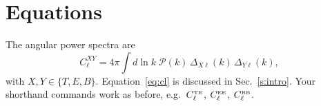\section{Equations}
    \label{s:eq}
    The angular power spectra are
    \begin{equation}
        C_\ell^{XY} = 4\pi \int d\ln k\;\mathcal{P}(k)\,\Delta_{X\ell}(k)\,\Delta_{Y\ell}(k),
        \label{eq:cl}
    \end{equation}
    with $X,Y\in\{T,E,B\}$. Equation~\eqref{eq:cl} is discussed in Sec.~\ref{s:intro}.
    Your shorthand commands work as before, e.g.\ $C_\ell^{{\scriptscriptstyle \mathrm{TE}}}$, $C_\ell^{{\scriptscriptstyle \mathrm{EE}}}$, $C_\ell^{{\scriptscriptstyle \mathrm{BB}}}$.

    \lipsum[3]

